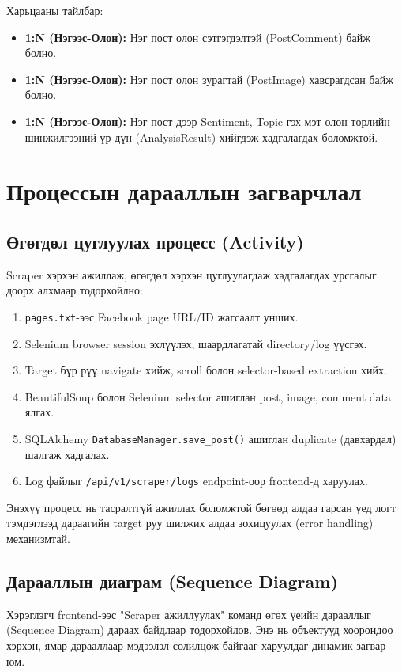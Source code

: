 Харьцааны тайлбар:
\begin{itemize}
    \item \textbf{1:N (Нэгээс-Олон):} Нэг пост олон сэтгэгдэлтэй (PostComment) байж болно.
    \item \textbf{1:N (Нэгээс-Олон):} Нэг пост олон зурагтай (PostImage) хавсрагдсан байж болно.
    \item \textbf{1:N (Нэгээс-Олон):} Нэг пост дээр Sentiment, Topic гэх мэт олон төрлийн шинжилгээний үр дүн (AnalysisResult) хийгдэж хадгалагдах боломжтой.
\end{itemize}

\section{Процессын дарааллын загварчлал}

\subsection{Өгөгдөл цуглуулах процесс (Activity)}

Scraper хэрхэн ажиллаж, өгөгдөл хэрхэн цуглуулагдаж хадгалагдах урсгалыг доорх алхмаар тодорхойлно:
\begin{enumerate}
    \item \texttt{pages.txt}-ээс Facebook page URL/ID жагсаалт унших.
    \item Selenium browser session эхлүүлэх, шаардлагатай directory/log үүсгэх.
    \item Target бүр рүү navigate хийж, scroll болон selector-based extraction хийх.
    \item BeautifulSoup болон Selenium selector ашиглан post, image, comment data ялгах.
    \item SQLAlchemy \texttt{DatabaseManager.save\_post()} ашиглан duplicate (давхардал) шалгаж хадгалах.
    \item Log файлыг \texttt{/api/v1/scraper/logs} endpoint-оор frontend-д харуулах.
\end{enumerate}

Энэхүү процесс нь тасралтгүй ажиллах боломжтой бөгөөд алдаа гарсан үед логт тэмдэглээд дараагийн target руу шилжих алдаа зохицуулах (error handling) механизмтай.

\subsection{Дарааллын диаграм (Sequence Diagram)}

Хэрэглэгч frontend-ээс "Scraper ажиллуулах" команд өгөх үеийн дарааллыг (Sequence Diagram) дараах байдлаар тодорхойлов. Энэ нь объектууд хоорондоо хэрхэн, ямар дарааллаар мэдээлэл солилцож байгааг харуулдаг динамик загвар юм.

